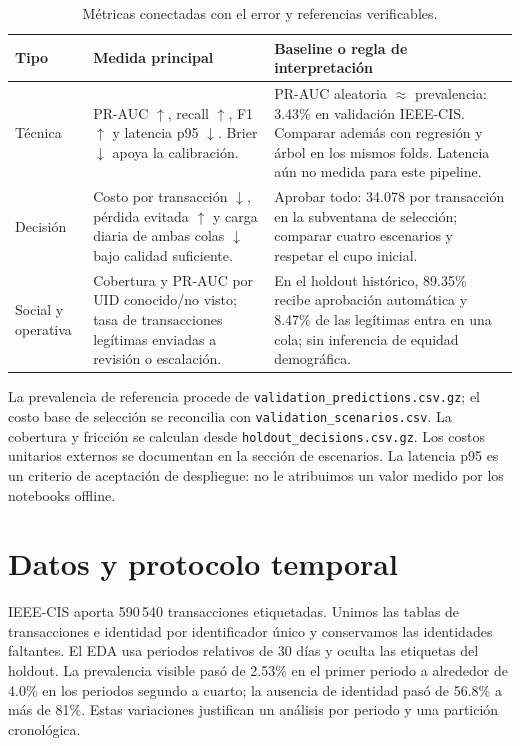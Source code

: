 \documentclass[11pt,letterpaper]{article}
\begin{document}
\begin{table}[H]\centering\small
\begin{tabularx}{\linewidth}{@{}p{25mm}X X@{}}\toprule
Tipo & Medida principal & Baseline o regla de interpretación\\\midrule
Técnica & PR-AUC $\uparrow$, recall $\uparrow$, F1 $\uparrow$ y latencia p95 $\downarrow$. Brier $\downarrow$ apoya la calibración. & PR-AUC aleatoria $\approx$ prevalencia: 3.43\% en validación IEEE-CIS. Comparar además con regresión y árbol en los mismos folds. Latencia aún no medida para este pipeline.\\
Decisión & Costo por transacción $\downarrow$, pérdida evitada $\uparrow$ y carga diaria de ambas colas $\downarrow$ bajo calidad suficiente. & Aprobar todo: 34.078 por transacción en la subventana de selección; comparar cuatro escenarios y respetar el cupo inicial.\\
Social y operativa & Cobertura y PR-AUC por UID conocido/no visto; tasa de transacciones legítimas enviadas a revisión o escalación. & En el holdout histórico, 89.35\% recibe aprobación automática y 8.47\% de las legítimas entra en una cola; sin inferencia de equidad demográfica.\\\bottomrule
\end{tabularx}
\caption{Métricas conectadas con el error y referencias verificables.}
\end{table}

La prevalencia de referencia procede de \texttt{validation\_predictions.csv.gz}; el costo base de selección se reconcilia con \texttt{validation\_scenarios.csv}. La cobertura y fricción se calculan desde \texttt{holdout\_decisions.csv.gz}. Los costos unitarios externos se documentan en la sección de escenarios. La latencia p95 es un criterio de aceptación de despliegue: no le atribuimos un valor medido por los notebooks offline.

\clearpage
\section{Datos y protocolo temporal}
IEEE-CIS aporta 590\,540 transacciones etiquetadas. Unimos las tablas de transacciones e identidad por identificador único y conservamos las identidades faltantes. El EDA usa periodos relativos de 30 días y oculta las etiquetas del holdout. La prevalencia visible pasó de 2.53\% en el primer periodo a alrededor de 4.0\% en los periodos segundo a cuarto; la ausencia de identidad pasó de 56.8\% a más de 81\%. Estas variaciones justifican un análisis por periodo y una partición cronológica.
\end{document}
